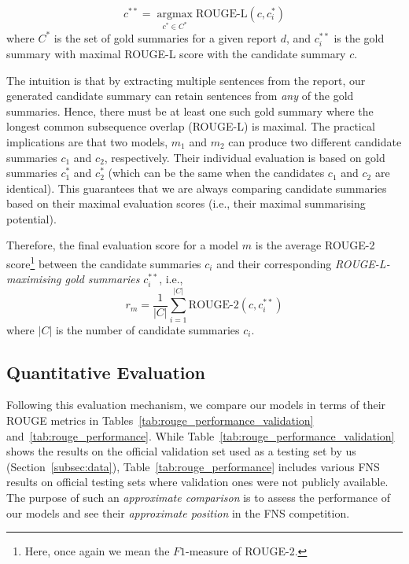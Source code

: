 \begin{equation}\label{eq:rouge_max}
    c^{**} = \underset{c^{*} \in C^{*}}{\operatorname{argmax}} \text{ROUGE-L}(c, c^{*}_{i})
\end{equation}
where $C^{*}$ is the set of gold summaries for a given report $d$, and $c^{**}_{i}$ is the gold summary with maximal ROUGE-L score with the candidate summary $c$.

The intuition is that by extracting multiple sentences from the report, our generated candidate summary can
retain sentences from \emph{any} of the gold summaries.
Hence, there must be at least one such gold summary where the longest common subsequence overlap (ROUGE-L) is maximal.
The practical implications are that two models, $m_{1}$ and $m_{2}$ can produce two different candidate summaries
$c_{1}$ and $c_{2}$, respectively.
Their individual evaluation is based on gold summaries $c^{*}_{1}$ and $c^{*}_{2}$ (which can be the same when the
candidates $c_{1}$ and $c_{2}$ are identical).
This guarantees that we are always comparing candidate summaries based on their maximal evaluation scores (i.e., their maximal summarising potential).

Therefore, the final evaluation score for a model $m$ is the average ROUGE-2 score\footnote{
    Here, once again we mean the $F1$-measure of ROUGE-2.
} between the candidate summaries $c_{i}$ and their corresponding \emph{ROUGE-L-maximising gold summaries} $c^{**}_{i}$, i.e.,
\begin{equation}\label{eq:rouge_final}
    r_{m} = \frac{1}{|C|} \sum_{i=1}^{|C|} \text{ROUGE-2}(c, c^{**}_{i})
\end{equation}
where $|C|$ is the number of candidate summaries $c_{i}$.

\subsection{Quantitative Evaluation}\label{subsec:quantitative-evaluation}
Following this evaluation mechanism, we compare our models in terms of their ROUGE metrics in Tables~\ref{tab:rouge_performance_validation} and~\ref{tab:rouge_performance}.
While Table~\ref{tab:rouge_performance_validation} shows the results on the official validation set used as a testing set by us (Section~\ref{subsec:data}),
Table~\ref{tab:rouge_performance} includes various FNS results on official testing sets where validation ones were not publicly available.
The purpose of such an \emph{approximate comparison} is to assess the performance of our models and see their \emph{approximate position} in the FNS competition.


